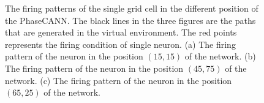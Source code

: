 \documentclass[preprint,12pt]{elsarticle}
\begin{document}
\begin{figure}[!t]
	\subfigcapskip=-10pt %
	\centering
	\hspace{-8mm}
	\hspace{-8mm}
	\caption{The firing patterns of the single grid cell in the different position of the PhaseCANN. The black lines in the three figures are the paths that are generated in the virtual environment. The red points represents the firing condition of single neuron. (a) The firing pattern of the neuron in the position $(15,15)$ of the network. (b) The firing pattern of the neuron in the position $(45,75)$ of the network. (c) The firing pattern of the neuron in the position $(65,25)$ of the network.}
	\label{fig:single_neuron_firing}
\end{figure}
\end{document}
